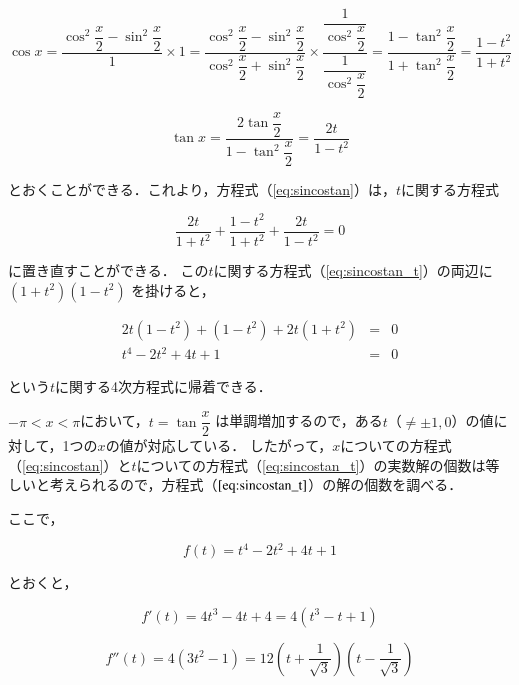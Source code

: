 \documentclass[a4paper,11pt]{jreport}
\begin{document}
\begin{equation}
  \cos x
  = \dfrac{\cos^2 \dfrac{x}{2} - \sin^2 \dfrac{x}{2}}{1} \times 1
  = \dfrac{\cos^2 \dfrac{x}{2} - \sin^2 \dfrac{x}{2}}{\cos^2 \dfrac{x}{2} + \sin^2 \dfrac{x}{2}} \times \dfrac{\dfrac{1}{\cos^2 \dfrac{x}{2}}}{\dfrac{1}{\cos^2 \dfrac{x}{2}}}
  = \dfrac{1 - \tan^2 \dfrac{x}{2}}{1 + \tan^2 \dfrac{x}{2}}
  = \dfrac{1 - t^2}{1 + t^2}
\end{equation}

\begin{equation}
  \tan x
  = \dfrac{2 \tan \dfrac{x}{2}}{1 - \tan^2 \dfrac{x}{2}}
  = \dfrac{2t}{1 - t^2}
\end{equation}

とおくことができる．これより，方程式（\ref{eq:sincostan}）は，$t$に関する方程式

\begin{equation}
  \dfrac{2t}{1 + t^2} + \dfrac{1 - t^2}{1 +t^2} + \dfrac{2t}{1 - t^2} = 0
  \label{eq:sincostan_t}
\end{equation}

に置き直すことができる．
この$t$に関する方程式（\ref{eq:sincostan_t}）の両辺に $(1 + t^2) (1 - t^2)$ を掛けると，

\begin{eqnarray}
  2t (1 - t^2) + (1 - t^2) + 2t (1 + t^2) & =  & 0
  \nonumber \\
  t^4 - 2t^2 + 4t + 1 & =  & 0
\end{eqnarray}

という$t$に関する4次方程式に帰着できる．

$- \pi < x < \pi$において，$t = \tan \dfrac{x}{2}$ は単調増加するので，ある$t$（$\neq \pm 1, 0$）の値に対して，1つの$x$の値が対応している．
したがって，$x$についての方程式（\ref{eq:sincostan}）と$t$についての方程式（\ref{eq:sincostan_t}）の実数解の個数は等しいと考えられるので，方程式（$\ref{eq:sincostan_t}$）の解の個数を調べる．

ここで，

\begin{equation}
  f(t) = t^4 - 2t^2 + 4t + 1
\end{equation}

とおくと，

\begin{equation}
  f'(t) = 4t^3 - 4t + 4 = 4(t^3 - t + 1)
\end{equation}

\begin{equation}
  f''(t) = 4(3t^2 - 1) = 12 \left( t + \dfrac{1}{\sqrt{3}} \right) \left( t - \dfrac{1}{\sqrt{3}} \right)
\end{equation}
\end{document}
